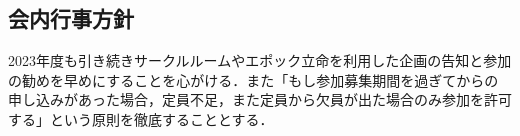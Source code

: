 \subsection*{会内行事方針}

2023年度も引き続きサークルルームやエポック立命を利用した企画の告知と参加の勧めを早めにすることを心がける．また「もし参加募集期間を過ぎてからの申し込みがあった場合，定員不足，また定員から欠員が出た場合のみ参加を許可する」という原則を徹底することとする．
